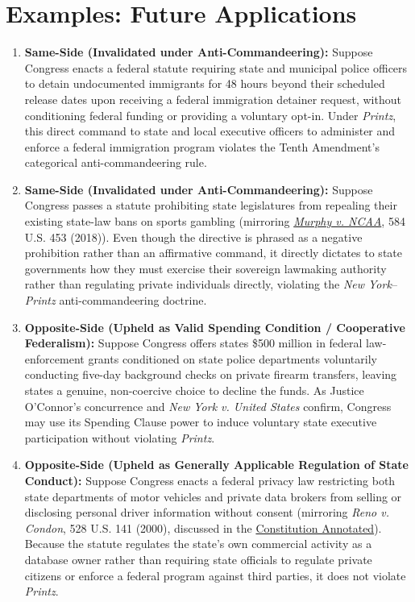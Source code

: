 \documentclass[12pt]{article}
\begin{document}
\section{Examples: Future Applications}
\begin{enumerate}
\item \textbf{Same-Side (Invalidated under Anti-Commandeering):} Suppose Congress enacts a federal statute requiring state and municipal police officers to detain undocumented immigrants for 48 hours beyond their scheduled release dates upon receiving a federal immigration detainer request, without conditioning federal funding or providing a voluntary opt-in. Under \textit{Printz}, this direct command to state and local executive officers to administer and enforce a federal immigration program violates the Tenth Amendment's categorical anti-commandeering rule.
\item \textbf{Same-Side (Invalidated under Anti-Commandeering):} Suppose Congress passes a statute prohibiting state legislatures from repealing their existing state-law bans on sports gambling (mirroring \href{https://www.law.cornell.edu/supremecourt/text/16-476}{\textit{Murphy v. NCAA}}, 584 U.S. 453 (2018)). Even though the directive is phrased as a negative prohibition rather than an affirmative command, it directly dictates to state governments how they must exercise their sovereign lawmaking authority rather than regulating private individuals directly, violating the \textit{New York}--\textit{Printz} anti-commandeering doctrine.
\item \textbf{Opposite-Side (Upheld as Valid Spending Condition / Cooperative Federalism):} Suppose Congress offers states \$500 million in federal law-enforcement grants conditioned on state police departments voluntarily conducting five-day background checks on private firearm transfers, leaving states a genuine, non-coercive choice to decline the funds. As Justice O'Connor's concurrence and \textit{New York v. United States} confirm, Congress may use its Spending Clause power to induce voluntary state executive participation without violating \textit{Printz}.
\item \textbf{Opposite-Side (Upheld as Generally Applicable Regulation of State Conduct):} Suppose Congress enacts a federal privacy law restricting both state departments of motor vehicles and private data brokers from selling or disclosing personal driver information without consent (mirroring \textit{Reno v. Condon}, 528 U.S. 141 (2000), discussed in the \href{https://constitution.congress.gov/browse/essay/amdt10-4-2/ALDE_00013627/}{Constitution Annotated}). Because the statute regulates the state's own commercial activity as a database owner rather than requiring state officials to regulate private citizens or enforce a federal program against third parties, it does not violate \textit{Printz}.

\end{enumerate}
\end{document}
